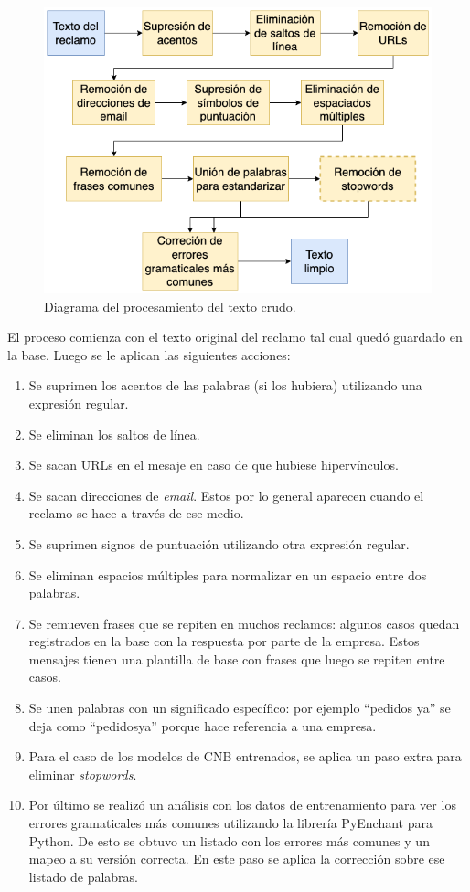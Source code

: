 \begin{figure}[htbp]
	\centering
	\includegraphics[width=.7\textwidth]{./Figures/pipeline-texto.png}
	\caption{Diagrama del procesamiento del texto crudo.}
	\label{fig:pipeline-texto}
\end{figure}

El proceso comienza con el texto original del reclamo tal cual quedó guardado en la base. Luego se le aplican las siguientes acciones:
\begin{enumerate}
	\item Se suprimen los acentos de las palabras (si los hubiera) utilizando una expresión regular.
	\item Se eliminan los saltos de línea.
	\item Se sacan URLs en el mesaje en caso de que hubiese hipervínculos.
	\item Se sacan direcciones de \textit{email}. Estos por lo general aparecen cuando el reclamo se hace a través de ese medio.
	\item Se suprimen signos de puntuación utilizando otra expresión regular.
	\item Se eliminan espacios múltiples para normalizar en un espacio entre dos palabras.
	\item Se remueven frases que se repiten en muchos reclamos: algunos casos quedan registrados en la base con la respuesta por parte de la empresa. Estos mensajes tienen una plantilla de base con frases que luego se repiten entre casos.
	\item Se unen palabras con un significado específico: por ejemplo ``pedidos ya'' se deja como ``pedidosya'' porque hace referencia a una empresa.
	\item Para el caso de los modelos de CNB entrenados, se aplica un paso extra para eliminar \textit{stopwords}.
	\item Por último se realizó un análisis con los datos de entrenamiento para ver los errores gramaticales más comunes utilizando la librería PyEnchant para Python. De esto se obtuvo un listado con los errores más comunes y un mapeo a su versión correcta. En este paso se aplica la corrección sobre ese listado de palabras.
\end{enumerate}

